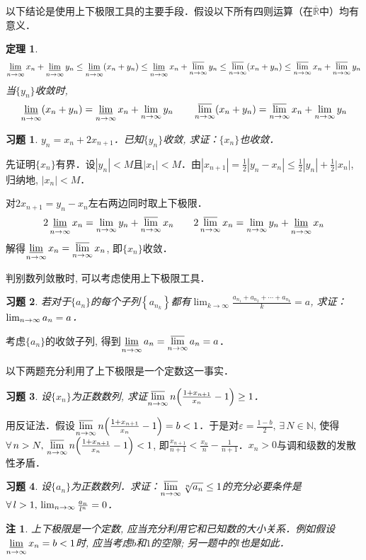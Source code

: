 \documentclass[11pt,a4paper]{ctexart}
\makeatletter
\theoremstyle{thmseries} %
\newtheorem{thm}{定理}[section]
\theoremstyle{exerseries}
\newtheorem{exer}{习题}[section]
\newtheorem*{rem}{注}
\renewenvironment{proof}[1][\proofname]{\par
  \pushQED{\qed}%
  \normalfont \topsep6\p@\@plus6\p@\relax
  \trivlist
  \item[\hskip\labelsep
        \itshape
    #1\@addpunct{}]\ignorespaces
}{%
  \popQED\endtrivlist\@endpefalse
}
\newenvironment{pf}{\begin{proof}[\bfseries\upshape 证\quad]}{\end{proof}}
\newcommand{\bra}[1]{\mathopen{}\left(#1\right)}
\newcommand{\cbra}[1]{\mathopen{}\left\{#1\right\}}
\renewcommand{\epsilon}{\varepsilon}
\newcommand{\R}{\mathbb{R}}
\newcommand{\N}{\mathbb{N}}
\def \nti {\mathnormal{n}\to\infty}
\DeclareMathOperator{\llim}{\underset{\nti}{\underline{\lim}}}
\DeclareMathOperator{\ulim}{\underset{\nti}{\overline{\lim}}}
\makeatother
\begin{document}
以下结论是使用上下极限工具的主要手段．假设以下所有四则运算（在$\overline{\R}$中）均有意义．
\begin{thm}
	\[\llim x_n+\llim y_n\leq\llim\bra{x_n+y_n}\leq\llim x_n+\ulim y_n\leq\ulim\bra{x_n+y_n}\leq\ulim x_n+\ulim y_n\]
	当$\{y_n\}$收敛时, 
	\[\llim\bra{x_n+y_n}=\llim x_n+\lim_{\nti} y_n\qquad\ulim\bra{x_n+y_n}=\ulim x_n+\lim_{\nti} y_n\]
\end{thm}

\begin{exer}
	$y_n=x_n+2x_{n+1}$．已知$\{y_n\}$收敛, 求证：$\{x_n\}$也收敛．
\end{exer}
\begin{pf}
	先证明$\{x_n\}$有界．设$|y_n|<M$且$|x_1|<M$．由$|x_{n+1}|=\frac{1}{2}|y_n-x_n|\leq\frac{1}{2}|y_n|+\frac{1}{2}|x_n|$, 归纳地, $|x_n|<M$．

	对$2x_{n+1}=y_n-x_n$左右两边同时取上下极限．
	\[2\llim x_n=\lim_{\nti}y_n+\ulim x_n\qquad2\ulim x_n=\lim_{\nti}y_n+\llim x_n\]
	解得$\llim x_n=\ulim x_n$, 即$\{x_n\}$收敛．
\end{pf}

判别数列敛散时, 可以考虑使用上下极限工具．
\begin{exer}
	若对于$\{a_n\}$的每个子列$\cbra{a_{n_k}}$都有$\lim_{k\to\infty}\frac{a_{n_1}+a_{n_2}+\cdots+a_{n_k}}{k}=a$, 求证：$\lim_{\nti}a_n=a$．
\end{exer}
\begin{pf}
	考虑$\{a_n\}$的收敛子列, 得到$\llim a_n=\ulim a_n=a$．
\end{pf}

以下两题充分利用了上下极限是一个定数这一事实．
\begin{exer}
	设$\{x_n\}$为正数数列, 求证$\ulim n\bra{\frac{1+x_{n+1}}{x_n}-1}\geq1$．
\end{exer}
\begin{pf}
	用反证法．假设$\ulim n\bra{\frac{1+x_{n+1}}{x_n}-1}=b<1$．于是对$\epsilon=\frac{1-b}{2},\,\exists\,N\in\N$, 使得$\forall\,n>N,\,\ulim n\bra{\frac{1+x_{n+1}}{x_n}-1}<1$, 即$\frac{x_{n+1}}{n+1}<\frac{x_n}{n}-\frac{1}{n+1}$．$x_n>0$与调和级数的发散性矛盾．
\end{pf}

\begin{exer}
	设$\{a_n\}$为正数数列．求证：$\ulim \sqrt[n]{a_n}\leq1$的充分必要条件是$\forall\,l>1,\,\lim_{\nti}\frac{a_n}{l^n}=0$．
\end{exer}
\begin{rem}
	上下极限是一个定数, 应当充分利用它和已知数的大小关系．例如假设$\llim x_n=b<1$时, 应当考虑$b$和$1$的空隙; 另一题中的$l$也是如此．
\end{rem}
\end{document}
